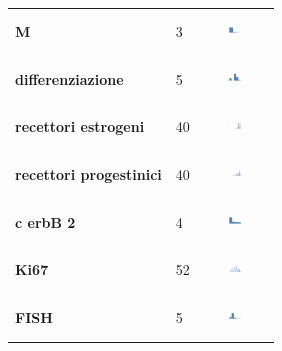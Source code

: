 \begin{table}[htbp]
\begin{tabularx}{\textwidth}{@{} l X c @{}}
\textbf{M} & 3 & \includegraphics[width=0.2\textwidth, height=10mm]{methodology/images/m} \\
\textbf{differenziazione} & 5 & \includegraphics[width=0.2\textwidth, height=10mm]{methodology/images/differenziazione}  \\
\textbf{recettori estrogeni} & 40 & \includegraphics[width=0.2\textwidth, height=10mm]{methodology/images/recettori_estrogeni} \\
\textbf{recettori progestinici} & 40 & \includegraphics[width=0.2\textwidth, height=10mm]{methodology/images/recettori_progestinici}\\
\textbf{c erbB 2} & 4 & \includegraphics[width=0.2\textwidth, height=10mm]{methodology/images/c_erb_2}\\
\textbf{Ki67} & 52 & \includegraphics[width=0.2\textwidth, height=10mm]{methodology/images/ki67}\\
\textbf{FISH} & 5 & \includegraphics[width=0.2\textwidth, height=10mm]{methodology/images/fish}\\
\bottomrule
\end{tabularx}
\label{tab:datasetdistribution}
\end{table}

